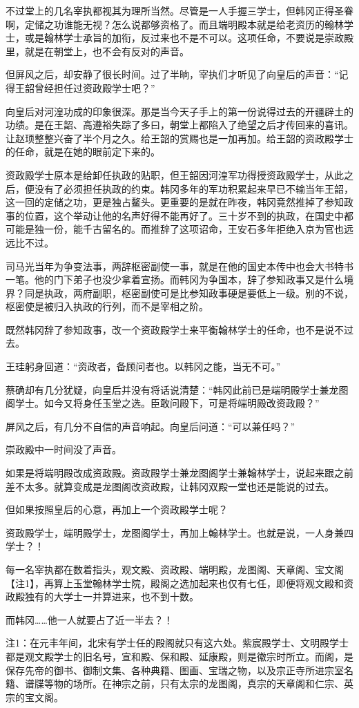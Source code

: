不过堂上的几名宰执都视其为理所当然。尽管是一人手握三学士，但韩冈正得圣眷啊，定储之功谁能无视？怎么说都够资格了。而且端明殿本就是给老资历的翰林学士，或是翰林学士承旨的加衔，反过来也不是不可以。这项任命，不要说是崇政殿里，就是在朝堂上，也不会有反对的声音。

但屏风之后，却安静了很长时间。过了半晌，宰执们才听见了向皇后的声音：“记得王韶曾经担任过资政殿学士吧？”

向皇后对河湟功成的印象很深。那是当今天子手上的第一份说得过去的开疆辟土的功绩。是在王韶、高遵裕失踪了多曰，朝堂上都陷入了绝望之后才传回来的喜讯。让赵顼整整兴奋了半个月之久。给王韶的赏赐也是一加再加。给王韶的资政殿学士的任命，就是在她的眼前定下来的。

资政殿学士原本是给卸任执政的贴职，但王韶因河湟军功得授资政殿学士，从此之后，便没有了必须担任执政的约束。韩冈多年的军功积累起来早已不输当年王韶，这一回的定储之功，更是独占鳌头。更重要的是就在昨夜，韩冈竟然推掉了参知政事的位置，这个举动让他的名声好得不能再好了。三十岁不到的执政，在国史中都可能是独一份，能千古留名的。而推辞了这项诏命，王安石多年拒绝入京为官也远远比不过。

司马光当年为争变法事，两辞枢密副使一事，就是在他的国史本传中也会大书特书一笔。他的门下弟子也没少拿着宣扬。而韩冈为争国本，辞了参知政事又是什么境界？同是执政，两府副职，枢密副使可是比参知政事硬是要低上一级。别的不说，枢密使是被归入执政的行列，而不是宰相之阶。

既然韩冈辞了参知政事，改一个资政殿学士来平衡翰林学士的任命，也不是说不过去。

王珪躬身回道：“资政者，备顾问者也。以韩冈之能，当无不可。”

蔡确却有几分犹疑，向皇后并没有将话说清楚：“韩冈此前已是端明殿学士兼龙图阁学士。如今又将身任玉堂之选。臣敢问殿下，可是将端明殿改资政殿？”

屏风之后，有几分不自信的声音响起。向皇后问道：“可以兼任吗？”

崇政殿中一时间没了声音。

如果是将端明殿改成资政殿。资政殿学士兼龙图阁学士兼翰林学士，说起来跟之前差不太多。就算变成是龙图阁改资政殿，让韩冈双殿一堂也还是能说的过去。

但如果按照皇后的心意，再加上一个资政殿学士呢？

资政殿学士，端明殿学士，龙图阁学士，再加上翰林学士。也就是说，一人身兼四学士？！

每一名宰执都在数着指头，观文殿、资政殿、端明殿，龙图阁、天章阁、宝文阁【注1】，再算上玉堂翰林学士院，殿阁之选加起来也仅有七任，即便将观文殿和资政殿独有的大学士一并算进来，也不到十数。

而韩冈……他一人就要占了近一半去？！

注1：在元丰年间，北宋有学士任的殿阁就只有这六处。紫宸殿学士、文明殿学士都是观文殿学士的旧名号，宣和殿、保和殿、延康殿，则是徽宗时所立。而阁，是保存先帝的御书、御制文集、各种典籍、图画、宝瑞之物，以及宗正寺所进宗室名籍、谱牒等物的场所。在神宗之前，只有太宗的龙图阁，真宗的天章阁和仁宗、英宗的宝文阁。


